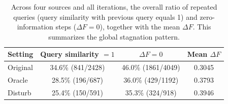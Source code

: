 \begin{table}[t]
\centering
\small
\setlength{\tabcolsep}{5pt}
\begin{tabular}{lccc}
\hline
Setting & Query similarity $=1$ & $\Delta F=0$ & Mean $\Delta F$ \\
\hline
Original & 34.6\% (841/2428) & 46.0\% (1861/4049) & 0.3045 \\
Oracle & 28.5\% (196/687) & 36.0\% (429/1192) & 0.3793 \\
Disturb & 25.4\% (150/591) & 35.3\% (324/918) & 0.3946 \\
\hline
\end{tabular}
\caption{Across four sources and all iterations, the overall ratio of repeated queries (query similarity with previous query equals 1) and zero-information steps ($\Delta F=0$), together with the mean $\Delta F$. This summarizes the global stagnation pattern.}
\label{tab:refamb-stagnation-ratios}
\end{table}
